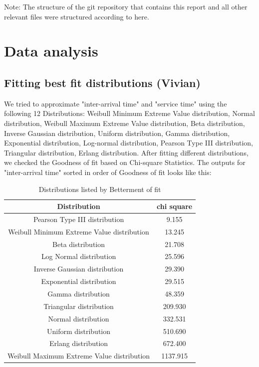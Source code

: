 \documentclass{article}
\begin{document}
Note: The structure of the git repository that contains this report and all other relevant files were structured according to here\cite{frery2020badging}.

\section{Data analysis}

\subsection{Fitting best fit distributions (Vivian)}

We tried to approximate "inter-arrival time" and "service time" using the following 12 Distributions: Weibull Minimum Extreme Value distribution, Normal distribution, Weibull Maximum Extreme Value distribution, Beta distribution, Inverse Gaussian distribution, Uniform distribution, Gamma distribution, Exponential distribution, Log-normal distribution, Pearson Type III distribution, Triangular distribution, Erlang distribution. After fitting different distributions, we checked the Goodness of fit based on Chi-square Statistics. The outputs for "inter-arrival time" sorted in order of Goodness of fit looks like this: 


\begin{table}[H]
    \caption{Distributions listed by Betterment of fit}
    \label{tab:Inter-arrival Best Fit}
    \begin{center}
    \begin{tabular}{c S}
        \toprule
        \textbf{Distribution} & \textbf{chi square}\\
        \midrule
        Pearson Type III distribution & 9.155\\
        Weibull Minimum Extreme Value distribution & 13.245\\
        Beta distribution & 21.708\\
        Log Normal distribution & 25.596\\
        Inverse Gaussian distribution & 29.390\\
        Exponential distribution & 29.515\\
        Gamma distribution & 48.359\\
        Triangular distribution & 209.930\\
        Normal distribution & 332.531\\
        Uniform distribution & 510.690\\
        Erlang distribution & 672.400\\
        Weibull Maximum Extreme Value distribution & 1137.915\\
        \bottomrule
    \end{tabular}
    \end{center}
\end{table}
\end{document}
